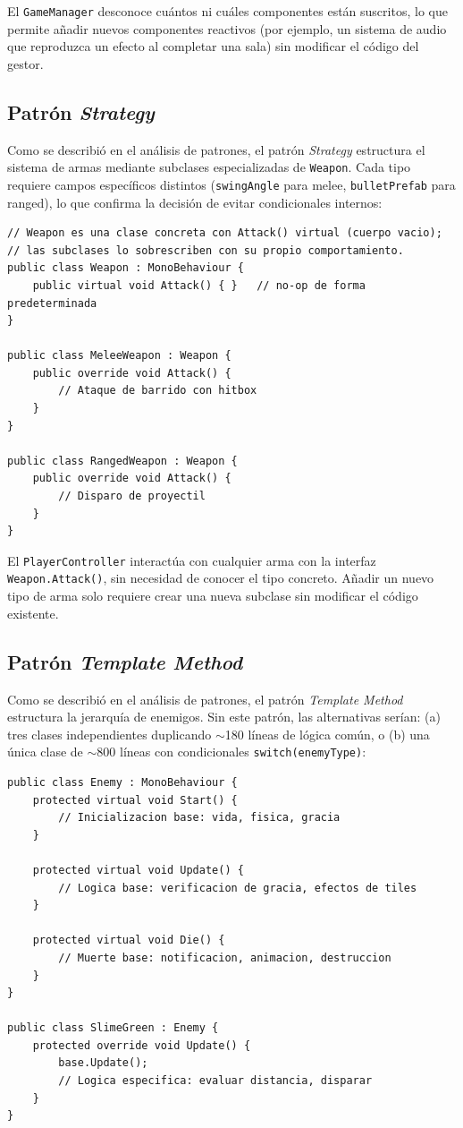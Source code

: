 El \texttt{GameManager} desconoce cuántos ni cuáles componentes están suscritos, lo que permite añadir nuevos componentes reactivos (por ejemplo, un sistema de audio que reproduzca un efecto al completar una sala) sin modificar el código del gestor.

\subsection{Patrón \textit{Strategy}}


Como se describió en el análisis de patrones, el patrón \textit{Strategy} estructura el sistema de armas mediante subclases especializadas de \texttt{Weapon}. Cada tipo requiere campos específicos distintos (\texttt{swingAngle} para melee, \texttt{bulletPrefab} para ranged), lo que confirma la decisión de evitar condicionales internos:

\begin{lstlisting}
// Weapon es una clase concreta con Attack() virtual (cuerpo vacio);
// las subclases lo sobrescriben con su propio comportamiento.
public class Weapon : MonoBehaviour {
    public virtual void Attack() { }   // no-op de forma predeterminada
}

public class MeleeWeapon : Weapon {
    public override void Attack() {
        // Ataque de barrido con hitbox
    }
}

public class RangedWeapon : Weapon {
    public override void Attack() {
        // Disparo de proyectil
    }
}
\end{lstlisting}


El \texttt{PlayerController} interactúa con cualquier arma con la interfaz \texttt{Weapon.Attack()}, sin necesidad de conocer el tipo concreto. Añadir un nuevo tipo de arma solo requiere crear una nueva subclase sin modificar el código existente.

\subsection{Patrón \textit{Template Method}}


Como se describió en el análisis de patrones, el patrón \textit{Template Method} estructura la jerarquía de enemigos. Sin este patrón, las alternativas serían: (a) tres clases independientes duplicando $\sim$180 líneas de lógica común, o (b) una única clase de $\sim$800 líneas con condicionales \texttt{switch(enemyType)}:

\begin{lstlisting}
public class Enemy : MonoBehaviour {
    protected virtual void Start() {
        // Inicializacion base: vida, fisica, gracia
    }
    
    protected virtual void Update() {
        // Logica base: verificacion de gracia, efectos de tiles
    }
    
    protected virtual void Die() {
        // Muerte base: notificacion, animacion, destruccion
    }
}

public class SlimeGreen : Enemy {
    protected override void Update() {
        base.Update();
        // Logica especifica: evaluar distancia, disparar
    }
}
\end{lstlisting}



